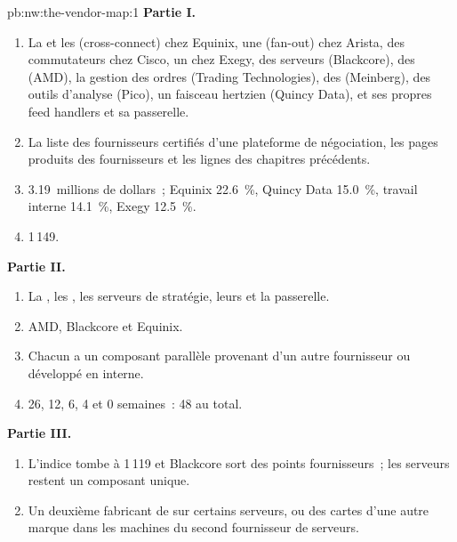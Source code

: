 \begin{solution}{pb:nw:the-vendor-map:1}
\textbf{Partie I.}
\begin{enumerate}
\item La  et les  (cross-connect) chez Equinix, une  (fan-out) chez Arista, des commutateurs chez Cisco, un  chez Exegy, des serveurs
  (Blackcore), des  (AMD), la gestion des ordres (Trading Technologies), des  (Meinberg), des outils d'analyse (Pico), un faisceau hertzien
  (Quincy Data), et ses propres feed handlers et sa passerelle.
\item La liste des fournisseurs certifiés d'une plateforme de négociation, les pages produits des fournisseurs et les lignes des chapitres précédents.
\item 3.19~millions de dollars~; Equinix 22.6~\%, Quincy Data 15.0~\%, travail interne 14.1~\%, Exegy 12.5~\%.
\item 1\,149.
\end{enumerate}
\textbf{Partie II.}
\begin{enumerate}[resume]
\item La , les , les serveurs de stratégie, leurs  et la passerelle.
\item AMD, Blackcore et Equinix.
\item Chacun a un composant parallèle provenant d'un autre fournisseur ou développé en interne.
\item 26, 12, 6, 4 et 0 semaines~: 48 au total.
\end{enumerate}
\textbf{Partie III.}
\begin{enumerate}[resume]
\item L'indice tombe à 1\,119 et Blackcore sort des points fournisseurs~; les serveurs restent un composant unique.
\item Un deuxième fabricant de  sur certains serveurs, ou des cartes d'une autre marque dans les machines du second fournisseur de serveurs.

\end{enumerate}
\end{solution}

